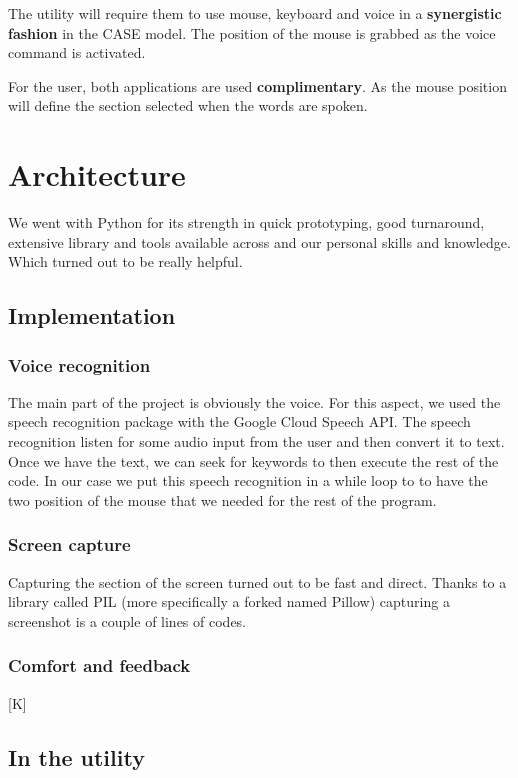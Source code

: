 The utility will require them to use mouse, keyboard and voice in a \textbf{synergistic fashion} in the CASE model.
The position of the mouse is grabbed as the voice command is activated.

For the user, both applications are used \textbf{complimentary}.
As the mouse position will define the section selected when the words are spoken. 

\section{Architecture}
We went with Python for its strength in quick prototyping, good turnaround, extensive library and tools available across and our personal skills and knowledge.
Which turned out to be really helpful.

\subsection{Implementation}
\subsubsection*{Voice recognition}
The main part of the project is obviously the voice.
For this aspect, we used the speech recognition package with the Google Cloud Speech API.
The speech recognition listen for some audio input from the user and then convert it to text. Once we have the text, we can seek for keywords to then execute the rest of the code.
In our case we put this speech recognition in a while loop to  to have the two position of the mouse that we needed for the rest of the program.

\subsubsection*{Screen capture}
Capturing the section of the screen turned out to be fast and direct. Thanks to a library called PIL (more specifically a forked named Pillow) capturing a screenshot is a couple of lines of codes. 

%

\subsubsection*{Comfort and feedback}
[K]

\subsection{In the utility}


